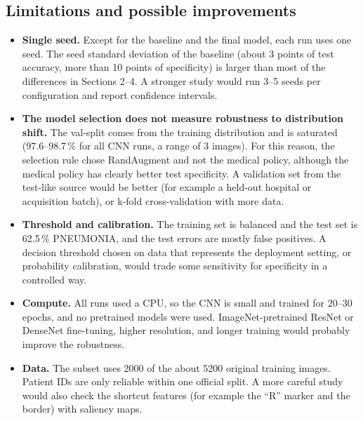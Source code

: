 \documentclass[10pt]{article}
\begin{document}
\subsection{Limitations and possible improvements}
\begin{itemize}
\item \textbf{Single seed.} Except for the baseline and the final model, each run uses one seed. The seed standard deviation of the baseline (about 3 points of test accuracy, more than 10 points of specificity) is larger than most of the differences in Sections 2--4.
  A stronger study would run 3--5 seeds per configuration and report confidence intervals.
\item \textbf{The model selection does not measure robustness to distribution shift.} The val-split comes from the training distribution and is saturated (97.6--98.7\,\% for all CNN runs, a range of 3 images).
  For this reason, the selection rule chose RandAugment and not the medical policy, although the medical policy has clearly better test specificity.
  A validation set from the test-like source would be better (for example a held-out hospital or acquisition batch), or k-fold cross-validation with more data.
\item \textbf{Threshold and calibration.} The training set is balanced and the test set is 62.5\,\% PNEUMONIA, and the test errors are mostly false positives. A decision threshold chosen on data that represents the deployment setting, or probability calibration, would trade some sensitivity for specificity in a controlled way.
\item \textbf{Compute.} All runs used a CPU, so the CNN is small and trained for 20--30 epochs, and no pretrained models were used. ImageNet-pretrained ResNet or DenseNet fine-tuning, higher resolution, and longer training would probably improve the robustness.
\item \textbf{Data.} The subset uses 2000 of the about 5200 original training images. Patient IDs are only reliable within one official split.
  A more careful study would also check the shortcut features (for example the ``R'' marker and the border) with saliency maps.
\end{itemize}
\end{document}
